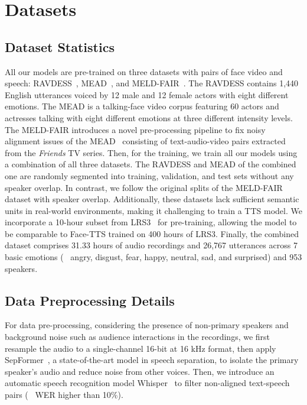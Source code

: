 \section{Datasets}
\label{sec:dataset}
\subsection{Dataset Statistics}
All our models are pre-trained on three datasets with pairs of face video and speech: RAVDESS~\cite{RAVDESS}, MEAD~\cite{MEAD:conf/eccv/WangWSYWQHQL20, EAT:conf/iccv/GanYYSY23}, and MELD-FAIR~\cite{meldfair:journals/ijon/CarneiroWW23}. 
The RAVDESS contains 1,440 English utterances voiced by 12 male and 12 female actors with eight different emotions. The MEAD is a talking-face video corpus featuring 60 actors and actresses talking with eight different emotions at three different intensity levels. The MELD-FAIR introduces a novel pre-processing pipeline to fix noisy alignment issues of the MEAD~\cite{MEAD:conf/eccv/WangWSYWQHQL20} consisting of text-audio-video pairs extracted from the \textit{Friends} TV series. 
Then, for the training, we train all our models using a combination of all three datasets. 
The RAVDESS and MEAD of the combined one are randomly segmented into training, validation, and test sets without any speaker overlap. In contrast, we follow the original splits of the MELD-FAIR dataset with speaker overlap. 
Additionally, these datasets lack sufficient semantic units in real-world environments, making it challenging to train a TTS model. We incorporate a 10-hour subset from LRS3~\cite{LRS3/abs-1809-00496} for pre-training, allowing the model to be comparable to Face-TTS trained on 400 hours of LRS3. 
Finally, the combined dataset comprises 31.33 hours of audio recordings and 26,767 utterances across 7 basic emotions (\ie~ angry, disgust, fear, happy, neutral, sad, and surprised) and 953 speakers.

\subsection{Data Preprocessing Details}
For data pre-processing, considering the presence of non-primary speakers and background noise such as audience interactions in the recordings, we first resample the audio to a single-channel 16-bit at 16 kHz format, then apply SepFormer~\cite{sepformer/SubakanRCBZ21}, a state-of-the-art model in speech separation, to isolate the primary speaker’s audio and reduce noise from other voices. Then, we introduce an automatic speech recognition model Whisper~\cite{whisper/RadfordKXBMS23} to filter non-aligned text-speech pairs (\ie~ WER higher than 10\%).



